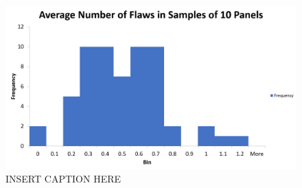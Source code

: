 \documentclass[letterpaper]{article}
\begin{document}
\section{}%

\subsection{}%

\subsection{}%

\section{}%

\subsection{}%

\subsection{}%

\subsection{}%

\begin{figure}[H]
 \centering
 \includegraphics[width=\textwidth]{q4.png}
 \caption{INSERT CAPTION HERE}
 \label{4c}
\end{figure}
\end{document}
